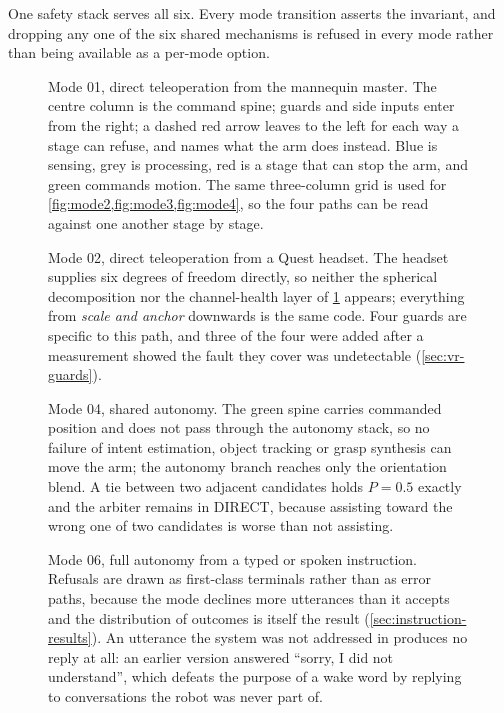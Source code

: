 One safety stack serves all six. Every mode transition asserts the invariant,
and dropping any one of the six shared mechanisms is refused in every mode
rather than being available as a per-mode option.

\begin{figure}[p]
  \centering
  
  \caption[Data path: direct teleoperation from the mannequin]{Mode 01,
  direct teleoperation from the mannequin master. The centre column is the
  command spine; guards and side inputs enter from the right; a dashed red
  arrow leaves to the left for each way a stage can refuse, and names what
  the arm does instead. Blue is sensing, grey is processing, red is a stage
  that can stop the arm, and green commands motion. The same three-column
  grid is used for \cref{fig:mode2,fig:mode3,fig:mode4}, so the four paths
  can be read against one another stage by stage.}
  \label{fig:mode1}
\end{figure}

\begin{figure}[p]
  \centering
  
  \caption[Data path: direct teleoperation from VR]{Mode 02, direct
  teleoperation from a Quest headset. The headset supplies six degrees of
  freedom directly, so neither the spherical decomposition nor the
  channel-health layer of \cref{fig:mode1} appears; everything from
  \emph{scale and anchor} downwards is the same code. Four guards are
  specific to this path, and three of the four were added after a measurement
  showed the fault they cover was undetectable
  (\cref{sec:vr-guards}).}
  \label{fig:mode2}
\end{figure}

\begin{figure}[p]
  \centering
  
  \caption[Data path: shared autonomy]{Mode 04, shared autonomy. The green
  spine carries commanded position and does not pass through the autonomy
  stack, so no failure of intent estimation, object tracking or grasp
  synthesis can move the arm; the autonomy branch reaches only the
  orientation blend. A tie between two adjacent candidates holds
  $P=\num{0.5}$ exactly and the arbiter remains in DIRECT, because assisting
  toward the wrong one of two candidates is worse than not assisting.}
  \label{fig:mode3}
\end{figure}

\begin{figure}[p]
  \centering
  
  \caption[Data path: full autonomy from an instruction]{Mode 06, full
  autonomy from a typed or spoken instruction. Refusals are drawn as
  first-class terminals rather than as error paths, because the mode declines
  more utterances than it accepts and the distribution of outcomes is itself
  the result (\cref{sec:instruction-results}). An utterance the system was
  not addressed in produces no reply at all: an earlier version answered
  ``sorry, I did not understand'', which defeats the purpose of a wake word
  by replying to conversations the robot was never part of.}
  \label{fig:mode4}
\end{figure}

